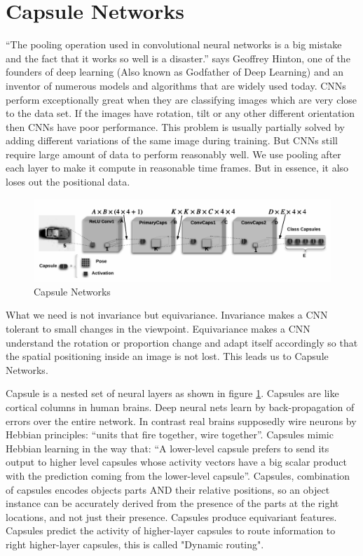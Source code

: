 \section{Capsule Networks} %
\label{sec:capsule_networks}
“The pooling operation used in convolutional neural networks is a big mistake and the fact that it works so well is a disaster.” says Geoffrey Hinton, one of the founders of deep learning (Also known as Godfather of Deep Learning) and an inventor of numerous models and algorithms that are widely used today. CNNs perform exceptionally great when they are classifying images which are very close to the data set. If the images have rotation, tilt or any other different orientation then CNNs have poor performance. This problem is usually partially solved by adding different variations of the same image during training. But CNNs still require large amount of data to perform reasonably well. We use pooling after each layer to make it compute in reasonable time frames. But in essence, it also loses out the positional data.\par\bigskip
\begin{figure}[H]
\centering\includegraphics[width=.7\textwidth]{images/caps.png}
\caption{Capsule Networks}
\label{fig:caps}
\end{figure}
What we need is not invariance but equivariance. Invariance makes a CNN tolerant to small changes in the viewpoint. Equivariance makes a CNN understand the rotation or proportion change and adapt itself accordingly so that the spatial positioning inside an image is not lost. This leads us to Capsule Networks.\par\bigskip
Capsule is a nested set of neural layers as shown in figure \ref{fig:caps}. Capsules are like cortical columns in human brains. Deep neural nets learn by back-propagation of errors over the entire network. In contrast real brains supposedly wire neurons by Hebbian principles: “units that fire together, wire together”. Capsules mimic Hebbian learning in the way that: “A lower-level capsule prefers to send its output to higher level capsules whose activity vectors have a big scalar product with the prediction coming from the lower-level capsule”. Capsules, combination of capsules encodes objects parts AND their relative positions, so an object instance can be accurately derived from the presence of the parts at the right locations, and not just their presence. Capsules produce equivariant features. Capsules predict the activity of higher-layer capsules to route information to right higher-layer capsules, this is called "Dynamic routing".

